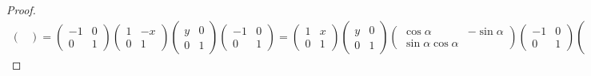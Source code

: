 \begin{proof}
\begin{align*}
\begin{pmatrix}
\end{pmatrix}=
\begin{pmatrix}
-1 &0\\
0 &1
\end{pmatrix}
\begin{pmatrix}
1 &-x\\
0 &1
\end{pmatrix}
\begin{pmatrix}
y &0\\
0 &1
\end{pmatrix}
\begin{pmatrix}
-1 &0\\
0 &1
\end{pmatrix}
=\begin{pmatrix}
1 &x\\
0 &1
\end{pmatrix}
\begin{pmatrix}
y &0\\
0 &1
\end{pmatrix}
\begin{pmatrix}
\cos \alpha &-\sin \alpha\\
\sin \alpha \cos \alpha
\end{pmatrix}
\begin{pmatrix}
-1 &0\\
0 &1
\end{pmatrix}
\begin{pmatrix}
\cos \beta &-\sin \beta\\
\sin \beta &\cos \beta
\end{pmatrix}
\begin{pmatrix}
r &0\\
0 &r
\end{pmatrix}
&=\begin{pmatrix}
-1 &0\\
0 &1
\end{pmatrix}
\begin{pmatrix}
1 &-x\\
0 &1
\end{pmatrix}
\begin{pmatrix}
y &0\\
0 &1
\end{pmatrix}
\begin{pmatrix}
\cos(\beta-\alpha) &-\sin(\beta-\alpha)\\
\sin(\beta-\alpha) &\cos(\beta-\alpha)
\end{pmatrix}
\begin{pmatrix}
r &0\\
0 &r
\end{pmatrix}

\end{align*}
\end{proof}

